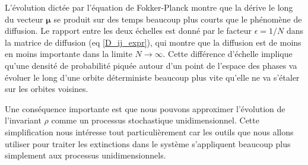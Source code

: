 \documentclass[openany,a4paper,12pt]{article}
\begin{document}
\par L'évolution dictée par l'équation de Fokker-Planck montre que la dérive le long du vecteur $\boldsymbol \mu$ se produit sur des temps beaucoup plus courts que le phénomène de diffusion. Le rapport entre les deux échelles est donné par le facteur $\epsilon = 1/N$ dans la matrice de diffusion (eq \ref{D_ij_expr}), qui montre que la diffusion est de moins en moins importante dans la limite $N\rightarrow\infty$. Cette différence d'échelle implique qu'une densité de probabilité piquée autour d'un point de l'espace des phases va évoluer le long d'une orbite déterministe beaucoup plus vite qu'elle ne va s'étaler sur les orbites voisines.

\par Une conséquence importante est que nous pouvons approximer l'évolution de l'invariant $\rho$ comme un processus stochastique unidimensionnel. %
Cette simplification nous intéresse tout particulièrement car les outils que nous allons utiliser pour traiter les extinctions dans le système s'appliquent beaucoup plus simplement aux processus unidimensionnels.
\end{document}
